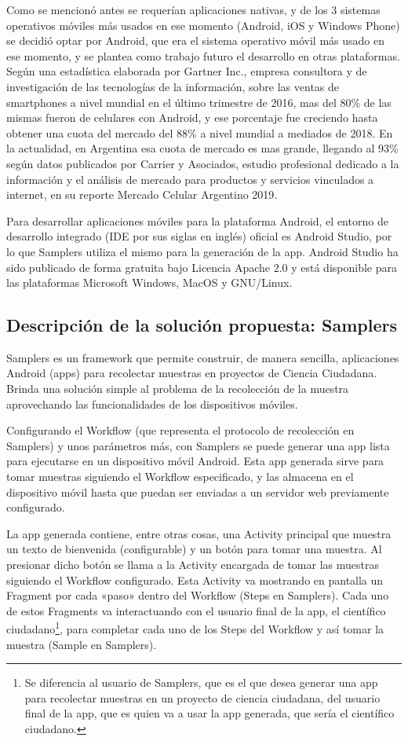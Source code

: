 Como se mencionó antes se requerían aplicaciones nativas, y de los 3 sistemas operativos móviles más usados en ese momento (Android, iOS y Windows Phone) se decidió optar por Android, que era el sistema operativo móvil más usado en ese momento, y se plantea como trabajo futuro el desarrollo en otras plataformas. Según una estadística elaborada por Gartner Inc., empresa consultora y de investigación de las tecnologías de la información, sobre las ventas de smartphones a nivel mundial en el último trimestre de 2016\cite{gartner}, mas del 80\% de las mismas fueron de celulares con Android, y ese porcentaje fue creciendo hasta obtener una cuota del mercado del 88\% a nivel mundial a mediados de 2018. En la actualidad, en Argentina esa cuota de mercado es mas grande, llegando al 93\% según datos publicados por Carrier y Asociados, estudio profesional dedicado a la información y el análisis de mercado para productos y servicios vinculados a internet, en su reporte Mercado Celular Argentino 2019\cite{carrier}.

Para desarrollar aplicaciones móviles para la plataforma Android, el entorno de desarrollo integrado (IDE por sus siglas en inglés) oficial es Android Studio\cite{androidStudio}, por lo que Samplers utiliza el mismo para la generación de la app. Android Studio ha sido publicado de forma gratuita bajo Licencia Apache 2.0 y está disponible para las plataformas Microsoft Windows, MacOS y GNU/Linux.

\subsection{Descripción de la solución propuesta: Samplers}
Samplers es un framework que permite construir, de manera sencilla, aplicaciones Android (apps) para recolectar muestras en proyectos de Ciencia Ciudadana. Brinda una solución simple al problema de la recolección de la muestra aprovechando las funcionalidades de los dispositivos móviles.

Configurando el Workflow (que representa el protocolo de recolección en Samplers) y unos parámetros más, con Samplers se puede generar una app lista para ejecutarse en un dispositivo móvil Android. Esta app generada sirve para tomar muestras siguiendo el Workflow especificado, y las almacena en el dispositivo móvil hasta que puedan ser enviadas a un servidor web previamente configurado.

La app generada contiene, entre otras cosas, una Activity principal que muestra un texto de bienvenida (configurable) y un botón para tomar una muestra. Al presionar dicho botón se llama a la Activity encargada de tomar las muestras siguiendo el Workflow configurado. Esta Activity va mostrando en pantalla un Fragment por cada «paso» dentro del Workflow (Steps en Samplers). Cada uno de estos Fragments va interactuando con el usuario final de la app, el científico ciudadano\footnote{Se diferencia al usuario de Samplers, que es el que desea generar una app para recolectar muestras en un proyecto de ciencia ciudadana, del usuario final de la app, que es quien va a usar la app generada, que sería el científico ciudadano.}, para completar cada uno de los Steps del Workflow y así tomar la muestra (Sample en Samplers).

